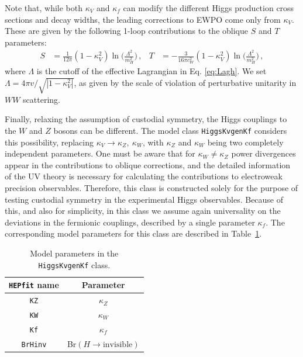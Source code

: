 \documentclass[preprint,3p,12pt]{elsarticle}
\newcommand{\HEPfit}{\texttt{HEPfit}\xspace}
\begin{document}
{Note that, while both $\kappa_V$ and $\kappa_f$ can modify the different Higgs production cross sections and decay widths, the leading corrections to EWPO come only from $\kappa_V$. These are given by the following 1-loop contributions to the oblique $S$ and $T$ parameters:
%
\begin{align}
S &= \frac{1}{12\pi} (1 - \kappa_V^2)
  \ln\bigg(\frac{\Lambda^2}{m_H^2}\bigg)\,,
&
T &= - \frac{3}{16\pi c_W^2} (1 - \kappa_V^2)
  \ln\bigg(\frac{\Lambda^2}{m_H^2}\bigg)\,,
\label{eq:ST}
\end{align}
where $\Lambda$ is the cutoff of the effective Lagrangian in Eq. \ref{eq:Lagh}.
We set $\Lambda = 4\pi v/\sqrt{|1-\kappa_V^2|}$, as given by the scale of 
violation of perturbative unitarity in $WW$ scattering.

Finally, relaxing the assumption of custodial symmetry, the Higgs couplings to the $W$ and $Z$ bosons can be different. The model class {\tt HiggsKvgenKf} considers this possibility, replacing $\kappa_V\rightarrow \kappa_Z,~\kappa_W$, with $\kappa_Z$ and $\kappa_W$ being two completely independent parameters. One must be aware that for $\kappa_W\not = \kappa_Z$ power divergences appear in the contributions to oblique corrections, and the detailed information of the UV theory is necessary for calculating the contributions to electroweak precision observables.
Therefore, this class is constructed solely for the purpose of testing custodial symmetry in the experimental Higgs observables. Because of this, and also for simplicity, in this class we assume again universality on the deviations in the fermionic couplings, described by a single parameter $\kappa_f$. The corresponding model parameters for this class are described in Table~\ref{tab:HiggsKvgenKfpars}.

\begin{table}[tb]
 \centering
 \caption{Model parameters in the {\tt HiggsKvgenKf} class.}\vspace{0.2cm}
  \begin{tabular}{| c c | }
\hline
%
\textbf{\HEPfit name}&
\textbf{Parameter}\\
%
\hline
 {\tt KZ}&
$\kappa_Z$\\
%
 {\tt KW}&
$\kappa_W$\\
%
 {\tt Kf}&
$\kappa_f$\\
%
 {\tt BrHinv}&
Br$(H\to \mathrm{invisible})$\\
\hline
  \end{tabular}
 \label{tab:HiggsKvgenKfpars}
\end{table} 


}
\end{document}
